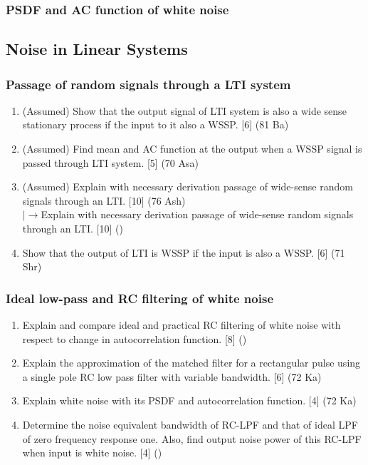 \documentclass[12pt]{article}
\newcommand{\lb}{\\$\left|\rightarrow\right.$}
\begin{document}
    \subsubsection{PSDF and AC function of white noise}
  \subsection{Noise in Linear Systems}
    \subsubsection{Passage of random signals through a LTI system}
    	\begin{enumerate}
    		\item (Assumed) Show that the output signal of LTI system is also a wide sense stationary process if the input to it also a WSSP. \hfill [6] (81 Ba)
    		
    		\item (Assumed) Find mean and AC function at the output when a WSSP signal is passed through LTI system. \hfill [5] (70 Asa)

        \item (Assumed) Explain with necessary derivation passage of wide-sense random signals through an LTI. \hfill [10] (76 Ash)
        \lb Explain with necessary derivation passage of wide-sense random signals through an LTI. \hfill [10] ()
        
        \item Show that the output of LTI is WSSP if the input is also a WSSP. \hfill [6] (71 Shr)
    	\end{enumerate}
    
    \subsubsection{Ideal low-pass and RC filtering of white noise}
      \begin{enumerate}
        \item Explain and compare ideal and practical RC filtering of white noise with respect to change in autocorrelation function. \hfill [8] ()
        
        \item Explain the approximation of the matched filter for a rectangular pulse using a single pole RC low pass filter with variable bandwidth. \hfill [6] (72 Ka)
        
        \item Explain white noise with its PSDF and autocorrelation function. \hfill [4] (72 Ka)
        
        \item  Determine the noise equivalent bandwidth of RC-LPF and that of ideal LPF of zero frequency response one. Also, find output noise power of this RC-LPF when input is white noise. \hfill [4] ()
      \end{enumerate}
\end{document}
